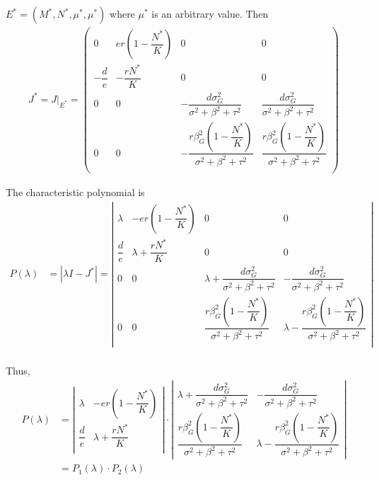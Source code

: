 \documentclass[12pt]{article}
\begin{document}
$E^* = (M^*, N^*, \mu^*, \mu^*)$ where $\mu^*$ is an arbitrary value.  Then
\begin{align*}
	J^* = J\big|_{E^*} = \left(
	\begin{array}{cccc}
	0 & er\left(1 - \dfrac{N^*}{K}\right) & 0 & 0 \\[.4cm]
	-\dfrac{d}{e} & -\dfrac{rN^*}{K} & 0 & 0 \\[.4cm]
	0 & 0 & -\dfrac{d\sigma_G^2 }{\sigma^2 + \beta^2 + \tau^2} & \dfrac{d\sigma_G^2 }{\sigma^2 + \beta^2 + \tau^2} \\[.4cm]
	0 & 0 & -\dfrac{r\beta_G^2\left(1 - \dfrac{N^*}{K}\right)}{\sigma^2 + \beta^2 + \tau^2} & \dfrac{r\beta_G^2\left(1 - \dfrac{N^*}{K}\right)}{\sigma^2 + \beta^2 + \tau^2} \\
	\end{array}
	\right)
\end{align*}

\noindent The characteristic polynomial is
\begin{align*}
	P(\lambda) &= \left|{\lambda I - J^*}\right| = \left|
	\begin{array}{cccc}
		\lambda & -er\left(1 - \dfrac{N^*}{K}\right) & 0 & 0 \\[.4cm]
		\dfrac{d}{e} & \lambda + \dfrac{rN^*}{K} & 0 & 0\\
		0 & 0 & \lambda + \dfrac{d\sigma_G^2 }{\sigma^2 + \beta^2 + \tau^2} & -\dfrac{d\sigma_G^2 }{\sigma^2 + \beta^2 + \tau^2} \\[.4cm]
		0 & 0 & \dfrac{r\beta_G^2\left(1 - \dfrac{N^*}{K}\right)}{\sigma^2 + \beta^2 + \tau^2} & \lambda - \dfrac{r\beta_G^2\left(1 - \dfrac{N^*}{K}\right)}{\sigma^2 + \beta^2 + \tau^2} \\
	\end{array}
	\right| \\[.3cm]
\end{align*}

\noindent Thus,
\begin{align*}
	P(\lambda) &= \left|
	\begin{array}{cc}
		\lambda & -er\left(1 - \dfrac{N^*}{K}\right) \\[.4cm]
		\dfrac{d}{e} & \lambda + \dfrac{rN^*}{K} \\
	\end{array}
	\right| \cdot \left|
	\begin{array}{cc}
		\lambda + \dfrac{d\sigma_G^2 }{\sigma^2 + \beta^2 + \tau^2} & -\dfrac{d\sigma_G^2 }{\sigma^2 + \beta^2 + \tau^2} \\[.4cm]
		\dfrac{r\beta_G^2\left(1 - \dfrac{N^*}{K}\right)}{\sigma^2 + \beta^2 + \tau^2} & \lambda - \dfrac{r\beta_G^2\left(1 - \dfrac{N^*}{K}\right)}{\sigma^2 + \beta^2 + \tau^2}	
	\end{array}
	\right| \\[.2cm]
	&= P_1(\lambda)\cdot P_2(\lambda)
\end{align*}
\end{document}
